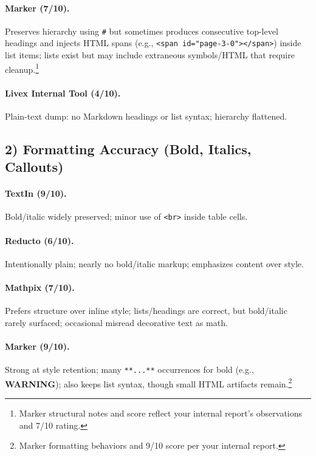 \documentclass[11pt,a4paper]{article}
\begin{document}
\paragraph{Marker (7/10).}
Preserves hierarchy using \verb|#| but sometimes produces consecutive top-level headings and injects HTML spans (e.g., \verb|<span id="page-3-0"></span>|) inside list items; lists exist but may include extraneous symbols/HTML that require cleanup.\footnote{Marker structural notes and score reflect your internal report’s observations and 7/10 rating.}

\paragraph{Livex Internal Tool (4/10).}
Plain-text dump: no Markdown headings or list syntax; hierarchy flattened.

\subsection*{2) Formatting Accuracy (Bold, Italics, Callouts)}

\paragraph{TextIn (9/10).}
Bold/italic widely preserved; minor use of \verb|<br>| inside table cells.

\paragraph{Reducto (6/10).}
Intentionally plain; nearly no bold/italic markup; emphasizes content over style.

\paragraph{Mathpix (7/10).}
Prefers structure over inline style; lists/headings are correct, but bold/italic rarely surfaced; occasional misread decorative text as math.

\paragraph{Marker (9/10).}
Strong at style retention; many \verb|**...**| occurrences for bold (e.g., \textbf{WARNING}); also keeps list syntax, though small HTML artifacts remain.\footnote{Marker formatting behaviors and 9/10 score per your internal report.}
\end{document}
